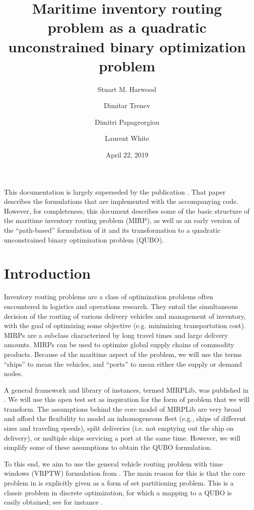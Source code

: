 \documentclass[11pt]{article}
\title{Maritime inventory routing problem as a quadratic unconstrained binary optimization problem}
\author{Stuart M. Harwood \and Dimitar Trenev \and Dimitri Papageorgiou \and Laurent White}
\date{April 22, 2019}
\theoremstyle{definition}
\newcommand{\0}{\mathbf{0}}
\begin{document}
\maketitle

This documentation is largely superseded by the publication \cite{harwood2021formulating}.
That paper describes the formulations that are implemented with the accompanying code.
However, for completeness, this document describes some of the basic structure of the maritime inventory routing problem (MIRP), as well as an early version of the ``path-based'' formulation of it and its transformation to a quadratic unconstrained binary optimization problem (QUBO).

\section{Introduction}
Inventory routing problems are a class of optimization problems often encountered in logistics and operations research.
They entail the simultaneous decision of the routing of various delivery vehicles and management of inventory, with the goal of optimizing some objective (e.g. minimizing transportation cost).
MIRPs are a subclass characterized by long travel times and large delivery amounts.
MIRPs can be used to optimize global supply chains of commodity products.
Because of the maritime aspect of the problem, we will use the terms ``ships'' to mean the vehicles, and ``ports'' to mean either the supply or demand nodes.

A general framework and library of instances, termed MIRPLib, was published in \cite{mirplib}.
We will use this open test set as inspiration for the form of problem that we will transform.
The assumptions behind the core model of MIRPLib are very broad and afford the flexibility to model an inhomogeneous fleet (e.g., ships of different sizes and traveling speeds), split deliveries (i.e. not emptying out the ship on delivery), or multiple ships servicing a port at the same time.
However, we will simplify some of these assumptions to obtain the QUBO formulation.

To this end, we aim to use the general vehicle routing problem with time windows (VRPTW) formulation from \cite{desrochersEA92}.
The main reason for this is that the core problem in \cite{desrochersEA92} is explicitly given as a form of set partitioning problem. 
This is a classic problem in discrete optimization, for which a mapping to a QUBO is easily obtained;
see for instance \cite[\S4.1]{lucas14}. %
\end{document}
